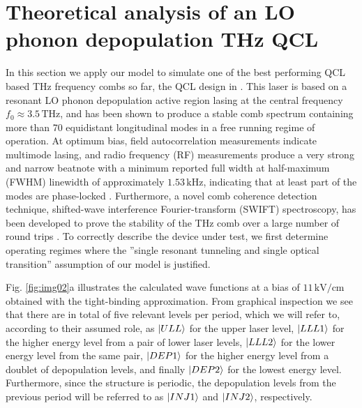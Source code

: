 \documentclass[10pt,letterpaper]{article}%
\begin{document}
\section{Theoretical analysis of an LO phonon depopulation THz QCL}

\label{sec:application}

In this section we apply our model to simulate one of the best performing QCL
based THz frequency combs so far, the QCL design in
\cite{burghoff2014terahertz}. This laser is based on a resonant LO phonon
depopulation active region lasing at the central frequency $f_{0}%
\approx3.5{\,}\mathrm{THz}$, and has been shown to produce a stable comb
spectrum containing more than 70 equidistant longitudinal modes in a free
running regime of operation. At optimum bias, field autocorrelation
measurements indicate multimode lasing, and radio frequency (RF) measurements
produce a very strong and narrow beatnote with a minimum reported full width
at half-maximum (FWHM) linewidth of approximately $1.53{\,}\mathrm{kHz}$,
indicating that at least part of the modes are phase-locked
\cite{hugi2012mid,burghoff2014terahertz,wienold2014evidence,rosch2015octave}.
Furthermore, a novel comb coherence detection technique, shifted-wave
interference Fourier-transform (SWIFT) spectroscopy, has been developed to
prove the stability of the THz comb over a large number of round trips
\cite{burghoff2015evaluating}. To correctly describe the device under test, we
first determine operating regimes where the ''single resonant tunneling and
single optical transition'' assumption of our model is justified.

Fig. \ref{fig:img02}a illustrates the calculated wave functions at a bias of
$11{\,}\mathrm{kV}/\mathrm{cm}$ obtained with the tight-binding approximation.
From graphical inspection we see that there are in total of five relevant
levels per period, which we will refer to, according to their assumed role, as
$\Ket{ULL}$ for the upper laser level, $\Ket{LLL1}$ for the higher energy
level from a pair of lower laser levels, $\Ket{LLL2}$ for the lower energy
level from the same pair, $\Ket{DEP1}$ for the higher energy level from a
doublet of depopulation levels, and finally $\Ket{DEP2}$ for the lowest energy
level. Furthermore, since the structure is periodic, the depopulation levels
from the previous period will be referred to as $\Ket{INJ1}$ and $\Ket{INJ2}$, respectively.
\end{document}
